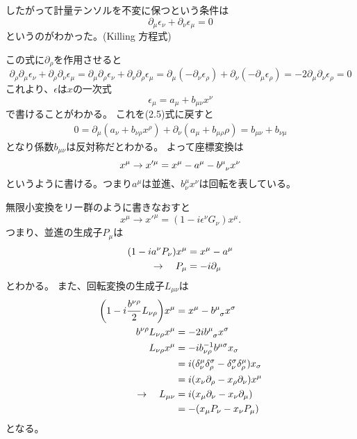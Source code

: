 \documentclass[../../master.tex]{subfiles}
\begin{document}
したがって計量テンソルを不変に保つという条件は
\begin{equation}
    \partial_\mu\epsilon_\nu + \partial_\nu\epsilon_\mu = 0
\end{equation}
というのがわかった。(Killing 方程式)

この式に\(\partial_\rho\)を作用させると
\begin{equation}
    \partial_\rho\partial_\mu\epsilon_\nu + \partial_\rho\partial_\nu\epsilon_\mu
    =\partial_\mu\partial_\rho\epsilon_\nu + \partial_\nu\partial_\rho\epsilon_\mu
    =\partial_\mu(-\partial_\nu \epsilon_\rho)+\partial_\nu(-\partial_\mu \epsilon_\rho)
    =-2\partial_\mu\partial_\nu\epsilon_\rho =0
\end{equation}
これより、\(\epsilon\)は\(x\)の一次式
\begin{equation}
    \epsilon_\mu = a_\mu + b_{\mu\nu}x^\nu
\end{equation}
で書けることがわかる。
これを(2.5)式に戻すと
\begin{align*}
    0=\partial_\mu(a_\nu+b_{\nu\rho}x^\rho) + \partial_\nu(a_\mu+b_{\mu\rho}\rho)=b_{\mu\nu}+b_{\nu\mu}
\end{align*}
となり係数\(b_{\mu\nu}\)は反対称だとわかる。
よって座標変換は
\begin{equation*}
    x^\mu\rightarrow x'^\mu = x^\mu -a^\mu -b\indices{^{\mu}_\nu}x^\nu
\end{equation*}
というように書ける。つまり\(a^\mu\)は並進、\(b_\nu^\mu x^\nu\)は回転を表している。

無限小変換をリー群のように書きなおすと
\begin{equation*}
    x^\mu\rightarrow x'^\mu = (1-i\epsilon^\nu G_\nu)x^\mu.
\end{equation*}
つまり、並進の生成子\(P_\mu\)は
\begin{align}
    (1-ia^\nu P_\nu)x^\mu&=x^\mu-a^\mu\notag\\
    \rightarrow \quad P_\mu &= -i\partial_\mu
\end{align}
とわかる。
また、回転変換の生成子\(L_{\mu\nu}\)は
\begin{align}
    \qty(1-i\frac{b^{\nu\rho}}{2}L_{\nu\rho})x^\mu &= x^\mu - b\indices{^{\mu}_\sigma} x^\sigma \notag\\
    b^{\nu\rho}L_{\nu\rho}x^\mu &= -2ib\indices{^{\mu}_\sigma} x^\sigma\notag\\
    L_{\nu\rho}x^\mu&=-ib_{\nu\rho}^{-1}b^{\mu\sigma} x_\sigma\notag\\
    &=i(\delta_\nu^\mu\delta_\rho^\sigma-\delta_\nu^\sigma\delta_\rho^\mu)x_\sigma\notag\\
    &=i(x_\nu\partial_\rho-x_\rho\partial_\nu)x^\mu\notag\\
    \rightarrow \quad L_{\mu\nu} &= i(x_\mu\partial_\nu-x_\nu\partial_\mu)\\
    &=-(x_\mu P_\nu-x_\nu P_\mu)\notag
\end{align}
となる。
\end{document}
